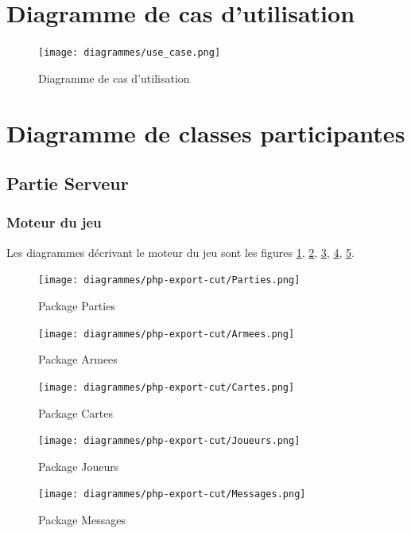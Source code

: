 \section{Diagramme de cas d'utilisation}
	\begin{figure}[!h]
		\centering
		\texttt{[image: diagrammes/use\_case.png]}
		\caption{Diagramme de cas d'utilisation}
	\end{figure}

\newpage

\section{Diagramme de classes participantes}
	\subsection{Partie Serveur}
		\subsubsection{Moteur du jeu}
        Les diagrammes décrivant le moteur du jeu sont les figures \ref{pparties}, \ref{parmees}, \ref{pcartes}, \ref{pjoueurs}, \ref{pmessages}.
			\begin{figure}[!h]
				\centering
                \texttt{[image: diagrammes/php-export-cut/Parties.png]}
                \caption{\label{pparties}Package Parties}
			\end{figure}

			\begin{figure}[!h]
				\centering
                \texttt{[image: diagrammes/php-export-cut/Armees.png]}
                \caption{\label{parmees}Package Armees}
			\end{figure}
            
			\begin{figure}[!h]
				\centering
                \texttt{[image: diagrammes/php-export-cut/Cartes.png]}
                \caption{\label{pcartes}Package Cartes}
			\end{figure}

			\begin{figure}[!h]
				\centering
                \texttt{[image: diagrammes/php-export-cut/Joueurs.png]}
                \caption{\label{pjoueurs}Package Joueurs}
			\end{figure}

			\begin{figure}[h!]
				\centering
                \texttt{[image: diagrammes/php-export-cut/Messages.png]}
                \caption{\label{pmessages}Package Messages}
                \pagebreak
			\end{figure} 

